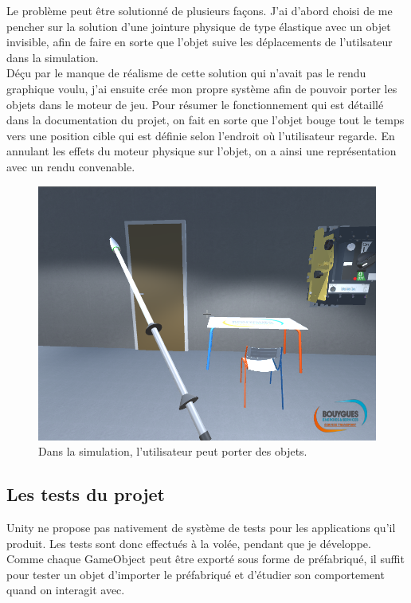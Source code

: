 \documentclass[a4paper]{article}
\begin{document}
    Le problème peut être solutionné de plusieurs façons. J'ai d'abord choisi de me pencher sur la solution d'une jointure physique de type élastique avec un objet invisible, afin de faire en sorte que l'objet suive les déplacements de l'utilsateur dans la simulation. \\

    Déçu par le manque de réalisme de cette solution qui n'avait pas le rendu graphique voulu, j'ai ensuite crée mon propre système afin de pouvoir porter les objets dans le moteur de jeu. Pour résumer le fonctionnement qui est détaillé dans la documentation du projet, on fait en sorte que l'objet bouge tout le temps vers une position cible qui est définie selon l'endroit où l'utilisateur regarde. En annulant les effets du moteur physique sur l'objet, on a ainsi une représentation avec un rendu convenable. \\

    \begin{figure}[H]
        \centering
        \includegraphics[scale=0.5]{img/SimulPorterObjet}
        \caption{Dans la simulation, l'utilisateur peut porter des objets.}
    \end{figure}

    \subsection{Les tests du projet}

    Unity ne propose pas nativement de système de tests pour les applications qu'il produit. Les tests sont donc effectués à la volée, pendant que je développe. Comme chaque GameObject peut être exporté sous forme de préfabriqué, il suffit pour tester un objet d'importer le préfabriqué et d'étudier son comportement quand on interagit avec.\\
\end{document}
